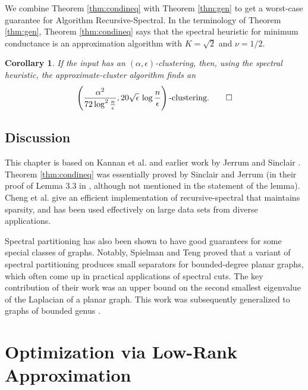\documentclass{book}
\newtheorem{corollary}[theorem]{Corollary}
\numberwithin{exercise}{chapter}
\begin{document}
We combine Theorem \ref{thm:condineq} with Theorem \ref{thm:gen}
to get a worst-case guarantee for Algorithm Recursive-Spectral. In the terminology of Theorem \ref{thm:gen},
Theorem \ref{thm:condineq} says that the spectral heuristic for minimum conductance
is an approximation algorithm with $K=\sqrt{2}$ and $\nu = 1/2$.

\begin{corollary}
\label{cor:spec}
If the input has an $(\alpha, \epsilon)$-clustering, then,
using the spectral heuristic, the approximate-cluster algorithm
finds an
\[
\left(\frac{\alpha^2}{72 \log^2 \frac{n}{\epsilon}}, 20 \sqrt{\epsilon}\,\log \frac{n}{\epsilon}\right)
\mbox{-clustering}.\qed
\]
\end{corollary}


\section{Discussion}

This chapter is based on Kannan et al. \cite{KVV04} and earlier work by Jerrum and Sinclair \cite{SJ89}.
Theorem \ref{thm:condineq} was essentially proved by
Sinclair and Jerrum (in their proof of Lemma 3.3 in \cite{SJ89}, although not
mentioned in the statement of the lemma).
Cheng et al. \cite{CKVW06} give an efficient implementation
of recursive-spectral that maintains sparsity, and
has been used effectively on large data sets from diverse applications.

Spectral partitioning has also been shown to have good guarantees for some special classes of graphs. Notably, Spielman and Teng \cite{ST2007} proved that a variant of spectral partitioning produces small separators for bounded-degree planar graphs, which often come up in practical applications of spectral cuts. The key contribution of their work was an upper bound on the second smallest eigenvalue of the Laplacian of a planar graph. This work was subsequently generalized to graphs of bounded genus \cite{Kelner2006}.







\chapter{Optimization via Low-Rank Approximation}\label{chap:maxrcsp}
\end{document}
